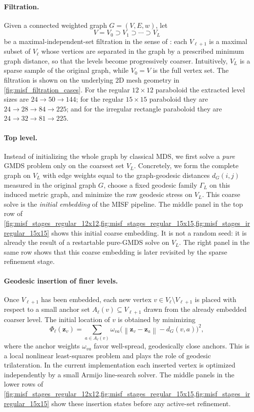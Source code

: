 \documentclass[twoside,11pt]{article}
\newcommand{\bz}{\mathbf{z}}
\newcommand{\norm}[1]{\left\|#1\right\|}
\begin{document}
\paragraph{Filtration.}
Given a connected weighted graph $G=(V,E,w)$, let
\[
  V = V_0 \supset V_1 \supset \cdots \supset V_L
\]
be a maximal-independent-set filtration in the sense of
\citet{gajer2004multidimensional,gajer2002grip}: each $V_{\ell+1}$ is a maximal
subset of $V_\ell$ whose vertices are separated in the graph by a prescribed
minimum graph distance, so that the levels become progressively coarser.
Intuitively, $V_L$ is a sparse sample of the original graph, while $V_0=V$ is
the full vertex set.  The filtration is shown on the underlying $2$D mesh
geometry in \cref{fig:misf_filtration_cases}.  For the regular $12\times 12$
paraboloid the extracted level sizes are $24 \rightarrow 50 \rightarrow 144$;
for the regular $15\times 15$ paraboloid they are
$24 \rightarrow 28 \rightarrow 84 \rightarrow 225$; and for the irregular
rectangle paraboloid they are $24 \rightarrow 32 \rightarrow 81 \rightarrow
225$.

\paragraph{Top level.}
Instead of initializing the whole graph by classical MDS, we first solve a
\emph{pure} GMDS problem only on the coarsest set $V_L$.  Concretely, we form
the complete graph on $V_L$ with edge weights equal to the graph-geodesic
distances $d_G(i,j)$ measured in the original graph $G$, choose a fixed
geodesic family $\Gamma_L$ on this induced metric graph, and minimize the raw
geodesic stress on $V_L$.  This coarse solve is the \emph{initial embedding} of
the MISF pipeline.  The middle panel in the top row of
\cref{fig:misf_stages_regular_12x12,fig:misf_stages_regular_15x15,fig:misf_stages_irregular_15x15}
shows this initial coarse embedding.  It is not a random seed: it is already
the result of a restartable pure-GMDS solve on $V_L$.  The right panel in the
same row shows that this coarse embedding is later revisited by the sparse
refinement stage.

\paragraph{Geodesic insertion of finer levels.}
Once $V_{\ell+1}$ has been embedded, each new vertex $v \in V_\ell \setminus
V_{\ell+1}$ is placed with respect to a small anchor set
$A_\ell(v) \subseteq V_{\ell+1}$ drawn from the already embedded coarser level.
The initial location of $v$ is obtained by minimizing
\[
  \Phi_\ell(\bz_v)
  =
  \sum_{a \in A_\ell(v)}
  \omega_{va}
  \bigl( \norm{\bz_v - \bz_a} - d_G(v,a) \bigr)^2,
\]
where the anchor weights $\omega_{va}$ favor well-spread, geodesically close
anchors.  This is a local nonlinear least-squares problem and plays the role of
geodesic trilateration.  In the current implementation each inserted vertex is
optimized independently by a small Armijo line-search solver.  The middle
panels in the lower rows of
\cref{fig:misf_stages_regular_12x12,fig:misf_stages_regular_15x15,fig:misf_stages_irregular_15x15}
show these insertion states before any active-set refinement.
\end{document}
